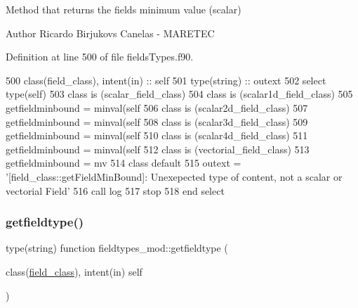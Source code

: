 Method that returns the field\textquotesingle{}s minimum value (scalar) 

\begin{DoxyAuthor}{Author}
Ricardo Birjukovs Canelas -\/ M\+A\+R\+E\+T\+EC 
\end{DoxyAuthor}


Definition at line 500 of file fields\+Types.\+f90.


\begin{DoxyCode}
500     \textcolor{keywordtype}{class}(field\_class), \textcolor{keywordtype}{intent(in)} :: self
501     \textcolor{keywordtype}{type}(string) :: outext
502     \textcolor{keywordflow}{select type}(self)
503 \textcolor{keywordflow}{    class is} (scalar\_field\_class)
504 \textcolor{keywordflow}{        class is} (scalar1d\_field\_class)
505             getfieldminbound = minval(self%
506 \textcolor{keywordflow}{        class is} (scalar2d\_field\_class)
507             getfieldminbound = minval(self%
508 \textcolor{keywordflow}{        class is} (scalar3d\_field\_class)
509             getfieldminbound = minval(self%
510 \textcolor{keywordflow}{        class is} (scalar4d\_field\_class)
511             getfieldminbound = minval(self%
512 \textcolor{keywordflow}{    class is} (vectorial\_field\_class)
513         getfieldminbound = mv
514 \textcolor{keywordflow}{        class default}
515         outext = \textcolor{stringliteral}{'[field\_class::getFieldMinBound]: Unexepected type of content, not a scalar or vectorial
       Field'}
516         \textcolor{keyword}{call }log%
517         stop
518 \textcolor{keywordflow}{    end select}
\end{DoxyCode}
\mbox{\label{namespacefieldtypes__mod_a5faf9c157541acaa9681be2d59eda850}} 
\subsubsection{\texorpdfstring{getfieldtype()}{getfieldtype()}}
{\footnotesize\ttfamily type(string) function fieldtypes\+\_\+mod\+::getfieldtype (\begin{DoxyParamCaption}\item[{class(\mbox{\hyperlink{structfieldtypes__mod_1_1field__class}{field\+\_\+class}}), intent(in)}]{self }\end{DoxyParamCaption})\hspace{0.3cm}{\ttfamily [private]}}



